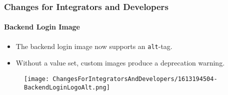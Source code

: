 %

\begin{frame}[fragile]
	\frametitle{Changes for Integrators and Developers}
	\framesubtitle{Backend Login Image}


	\begin{itemize}
		\item The backend login image now supports an \texttt{alt}-tag.
		\item Without a value set, custom images produce a deprecation warning.
	\end{itemize}

	\begin{figure}
		\texttt{[image: ChangesForIntegratorsAndDevelopers/1613194504-BackendLoginLogoAlt.png]}
	\end{figure}

\end{frame}

